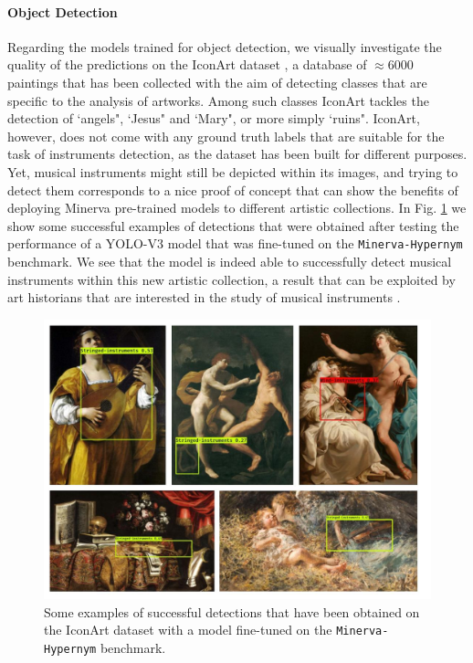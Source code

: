 \paragraph{Object Detection}
Regarding the models trained for object detection, we visually investigate the quality of the predictions on the IconArt dataset \cite{gonthier2018weakly}, a database of $\approx 6000$ paintings that has been collected with the aim of detecting classes that are specific to the analysis of artworks. Among such classes IconArt tackles the detection of `angels", `Jesus" and `Mary", or more simply `ruins". IconArt, however, does not come with any ground truth labels that are suitable for the task of instruments detection, as the dataset has been built for different purposes. Yet, musical instruments might still be depicted within its images, and trying to detect them corresponds to a nice proof of concept that can show the benefits of deploying Minerva pre-trained models to different artistic collections. In Fig. \ref{fig:wikiart_detections} we show some successful examples of detections that were obtained after testing the performance of a YOLO-V3 model that was fine-tuned on the \texttt{Minerva-Hypernym} benchmark. We see that the model is indeed able to successfully detect musical instruments within this new artistic collection, a result that can be exploited by art historians that are interested in the study of musical instruments .   

\begin{figure}[ht!]
\centering
  \includegraphics[width=\linewidth]{./Images/Chapter05/wikiart_detections}
  \caption{Some examples of successful detections that have been obtained on the IconArt dataset with a model fine-tuned on the \texttt{Minerva-Hypernym} benchmark.}
  \label{fig:wikiart_detections}
\end{figure}


